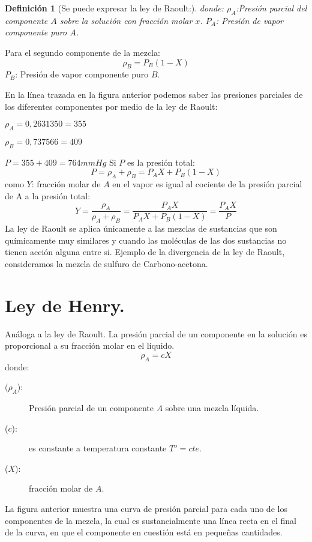 \documentclass[11pt,openany]{book}
\newtheorem{defi}{Definición}
\begin{document}
 \begin{defi}[{Se puede expresar la ley de Raoult:}]
  donde:
  $\rho_A$:Presión parcial del componente $A$ sobre la solución con fracción molar $x$.  
  $P_A$: Presión de vapor componente puro $A$.
\end{defi}

  Para el segundo componente de la mezcla:
   \begin{equation}
   \boxed{\rho_B=P_B (1-X)}
   \end{equation}
  $P_B$: Presión de vapor componente puro $B$.

En la línea trazada en la figura anterior podemos saber las presiones parciales de los diferentes
 componentes por medio de la ley de Raoult:

$\rho_A=0,263 1350 = 355$

$\rho_B= 0,737 566 = 409$

$P = 355 + 409 = 764 mmHg$ 
Si $P$ es la presión total:
\begin{equation}
\boxed{P=\rho_A + \rho_B = P_A X+P_B (1-X)}
\end{equation}
como $Y$: fracción molar de $A$ en el vapor es igual al cociente de la presión parcial de A a la presión total:
\begin{equation}
\boxed{Y=\frac{\rho_A}{\rho_A+\rho_B}=\frac{P_A X}{P_A X+P_B (1-X)}=\frac{P_A X}{P}}
\end{equation}
La ley de Raoult se aplica únicamente a las mezclas de sustancias que son químicamente muy similares 
y cuando las moléculas de las dos sustancias no tienen acción alguna entre si. Ejemplo de la 
divergencia de la ley de Raoult, consideramos la mezcla de sulfuro de Carbono-acetona.

\section{Ley de Henry.}

Análoga a la ley de Raoult. La presión parcial de un componente en la solución es proporcional a su 
fracción molar en el líquido.
\begin{equation}
\boxed{\rho_A=c X}
\end{equation}
donde:
\begin{description}
\item [$(\rho_A$):] Presión parcial de un componente $A$ sobre una mezcla líquida.
\item [($c$):] es constante a temperatura constante $T^o=cte.$
\item [($X$):] fracción molar de $A$.
\end{description}
La figura anterior muestra una curva de presión parcial para cada uno de los componentes de la 
mezcla, la cual es sustancialmente una línea recta en el final de la curva, en que el componente en 
cuestión está en pequeñas cantidades.
\end{document}
